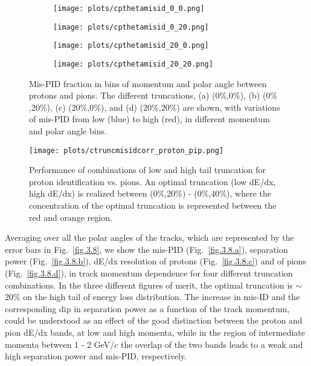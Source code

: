 \begin{figure}[H]
    \centering
    \begin{subfigure}[b]{0.5\textwidth}
        \texttt{[image: plots/cpthetamisid\_0\_0.png]}
        \caption{}
        \label{fig.3.6.a} 
    \end{subfigure}\hfill
    \begin{subfigure}[b]{0.5\textwidth}
        \texttt{[image: plots/cpthetamisid\_0\_20.png]}
        \caption{}
        \label{fig.3.6.b} 
    \end{subfigure}\hfill
    \begin{subfigure}[b]{0.5\textwidth}
        \texttt{[image: plots/cpthetamisid\_20\_0.png]}
        \caption{}
        \label{fig.3.6.c} 
    \end{subfigure}\hfill
    \begin{subfigure}[b]{0.5\textwidth}
        \texttt{[image: plots/cpthetamisid\_20\_20.png]}
        \caption{}
        \label{fig.3.6.d}
    \end{subfigure}
    \caption{\label{fig.3.6}Mis-PID fraction in bins of momentum and polar angle between protons and pions. The different truncations, (a) (0$\%$,0$\%$), (b) (0$\%$,20$\%$), (c) (20$\%$,0$\%$), and (d) (20$\%$,20$\%$) are shown, with variations of mis-PID from low (blue) to high (red), in different momentum and polar angle bins.}
\end{figure}

\begin{figure}[H]
    \centering
    \texttt{[image: plots/ctruncmisidcorr\_proton\_pip.png]}
    \caption{Performance of combinations of low and high tail truncation for proton identification vs. pions. An optimal truncation (low dE/dx, high dE/dx) is realized between (0$\%$,20$\%$) - (0$\%$,40$\%$), where the concentration of the optimal truncation is represented between the red and orange region.}
    \label{fig.3.7}
\end{figure}

Averaging over all the polar angles of the tracks, which are represented by the error bars in Fig.~\ref{fig.3.8}, we show the mis-PID (Fig.~\ref{fig.3.8.a}), separation power (Fig.~\ref{fig.3.8.b}), dE/dx resolution of protons (Fig.~\ref{fig.3.8.c}) and of pions (Fig.~\ref{fig.3.8.d}), in track momentum dependence for four different truncation combinations. In the three different figures of merit, the optimal truncation is $\sim$ 20$\%$ on the high tail of energy loss distribution. The increase in mis-ID and the corresponding dip in separation power as a function of the track momentum, could be understood as an effect of the good distinction between the proton and pion dE/dx bands, at low and high momenta, while in the region of intermediate momenta between 1 - 2 GeV/$c$ the overlap of the two bands leads to a weak and high separation power and mis-PID, respectively.

